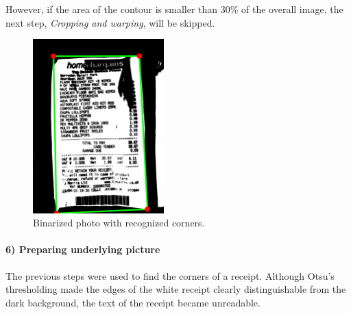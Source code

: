 \documentclass[
  digital, %
  table,   %
  oneside, %
  lof,     %
  lot,     %
]{fithesis3}
\newcommand\half{0.45}
\begin{document}
However, if the area of the contour is smaller than 30\% of the overall image, the next step, \textit{Cropping and warping}, will be skipped.

\begin{figure}
    \begin{center}
        \includegraphics[width=\half\textwidth]{figures/image_processing/points_and_edges}
    \end{center}
    \caption{Binarized photo with recognized corners.}
    \label{fig:points_and_edges}
\end{figure}

\paragraph{6) Preparing underlying picture} The previous steps were used to find the corners of a receipt. Although Otsu's thresholding made the edges of the white receipt clearly distinguishable from the dark background, the text of the receipt became unreadable. 
\end{document}

